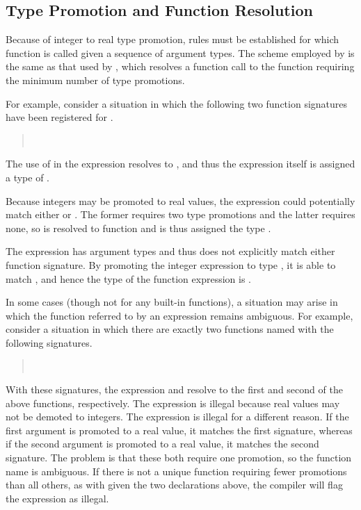 \subsection{Type Promotion and Function Resolution}\label{type-promotion.section}

Because of integer to real type promotion, rules must be established
for which function is called given a sequence of argument types.  The
scheme employed by \Stan is the same as that used by \Cpp, which
resolves a function call to the function requiring the minimum number
of type promotions.  

For example, consider a situation in which the following two function
signatures have been registered for .
%
\begin{quote}
\\
\end{quote}
%
The use of  in the expression  resolves
to , and thus the expression 
itself is assigned a type of .  

Because integers may be promoted to real values, the expression
 could potentially match either 
or .  The former requires two type promotions and
the latter requires none, so  is resolved to function
 and is thus assigned the type .

The expression  has argument types 
and thus does not explicitly match either function signature.  By
promoting the integer expression  to type , it is
able to match , and hence the type of the
function expression  is .

In some cases (though not for any built-in \Stan functions), a
situation may arise in which the function referred to by an
expression remains ambiguous.  For example, consider a situation in
which there are exactly two functions named  with the
following signatures.
%
\begin{quote}
\\
\end{quote}
%
With these signatures, the expression  and
 resolve to the first and second of the above
functions, respectively.  The expression  is
illegal because real values may not be demoted to integers.  The
expression  is illegal for a different reason.  If the
first argument is promoted to a real value, it matches the first
signature, whereas if the second argument is promoted to a real value,
it matches the second signature.  The problem is that these both
require one promotion, so the function name  is ambiguous.
If there is not a unique function requiring fewer promotions than all
others, as with  given the two declarations above, 
the \Stan compiler will flag the expression as illegal. 

